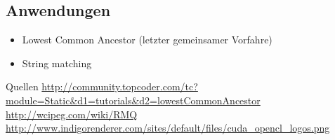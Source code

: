 \documentclass[11pt]{beamer}
\begin{document}
\subsection{Anwendungen}
\begin{frame}
\begin{itemize}
	\item Lowest Common Ancestor (letzter gemeinsamer Vorfahre)
	\item String matching
\end{itemize}
\end{frame}

\begin{frame}
 \begin{block}{Quellen}
   \url{http://community.topcoder.com/tc?module=Static&d1=tutorials&d2=lowestCommonAncestor}
   \url{http://wcipeg.com/wiki/RMQ}
   \url{http://www.indigorenderer.com/sites/default/files/cuda_opencl_logos.png}
 \end{block}
\end{frame}

\thispagestyle{empty}
\end{document}
